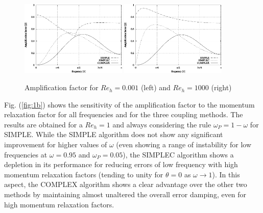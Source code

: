 \documentclass[final,3p,times,11pt,onecolumn]{myElsarticle}
\numberwithin{equation}{section}
\begin{document}
\begin{figure}[H]
    \centering
    \includegraphics[width=0.45\textwidth]{fig/Re0001} \hspace{1cm}
    \includegraphics[width=0.45\textwidth]{fig/Re1000}
    \caption{Amplification factor for $Re_h=0.001$ (left) and $Re_h=1000$ (right)}
    \label{fig:1a}
\end{figure}
    
Fig. (\ref{fig:1b}) shows the sensitivity of the amplification factor to the momentum relaxation factor for all frequencies and for the three coupling methods. The results are obtained for a $Re_h=1$ and always considering the rule $\omega_P = 1 - \omega$ for SIMPLE. While the SIMPLE algorithm does not show any significant improvement for higher values of $\omega$ (even showing a range of instability for low frequencies at $\omega=0.95$ and $\omega_P=0.05$), the SIMPLEC algorithm shows a depletion in its performance for reducing errors of low frequency with high momentum relaxation factors (tending to unity for $\theta=0$ as $\omega \rightarrow 1$). In this aspect, the COMPLEX algorithm shows a clear advantage over the other two methods by maintaining almost unaltered the overall error damping, even for high momentum relaxation factors.     
    
\end{document}
